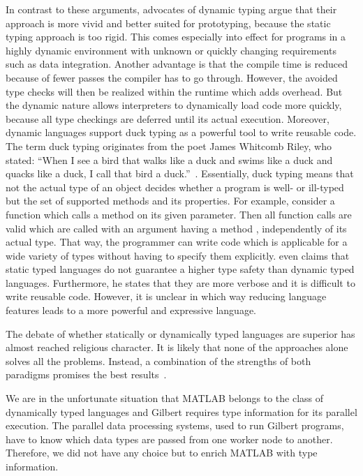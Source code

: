 In contrast to these arguments, advocates of dynamic typing argue that their approach is more vivid and better suited for prototyping, because the static typing approach is too rigid.
This comes especially into effect for programs in a highly dynamic environment with unknown or quickly changing requirements such as data integration.
Another advantage is that the compile time is reduced because of fewer passes the compiler has to go through.
However, the avoided type checks will then be realized within the runtime which adds overhead.
But the dynamic nature allows interpreters to dynamically load code more quickly, because all type checkings are deferred until its actual execution.
Moreover, dynamic languages support duck typing as a powerful tool to write reusable code.
The term duck typing originates from the poet James Whitcomb Riley, who stated: \enquote{When I see a bird that walks like a duck and swims like a duck and quacks like a duck, I call that bird a duck.}~\cite{heim:2007a}.
Essentially, duck typing means that not the actual type of an object decides whether a program is well- or ill-typed but the set of supported methods and its properties.
For example, consider a function which calls a method  on its given parameter.
Then all function calls are valid which are called with an argument having a method , independently of its actual type.
That way, the programmer can write code which is applicable for a wide variety of types without having to specify them explicitly.
\textcite{ousterhout:c1998a} even claims that static typed languages do not guarantee a higher type safety than dynamic typed languages.
Furthermore, he states that they are more verbose and it is difficult to write reusable code.
However, it is unclear in which way reducing language features leads to a more powerful and expressive language. 

The debate of whether statically or dynamically typed languages are superior has almost reached religious character.
It is likely that none of the approaches alone solves all the problems.
Instead, a combination of the strengths of both paradigms promises the best results~\cite{meijer:2004a}.

We are in the unfortunate situation that MATLAB belongs to the class of dynamically typed languages and Gilbert requires type information for its parallel execution.
The parallel data processing systems, used to run Gilbert programs, have to know which data types are passed from one worker node to another.
Therefore, we did not have any choice but to enrich MATLAB with type information.

